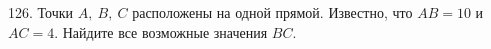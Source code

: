 126. Точки $A,\ B,\ C$ расположены на одной прямой. Известно, что $AB=10$ и $AC=4.$ Найдите все возможные значения $BC.$\\
